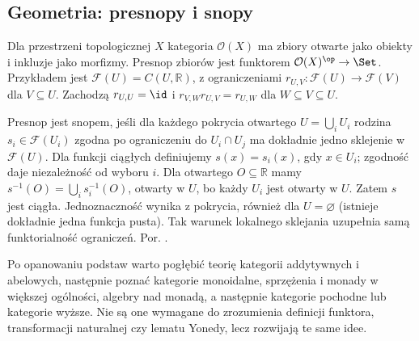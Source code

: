 \subsection{Geometria: presnopy i snopy}

\begin{przyklad}\label{cat:ex:continuous-sheaf}
Dla przestrzeni topologicznej $X$ kategoria $\mathcal O(X)$ ma zbiory otwarte jako obiekty i inkluzje jako morfizmy. Presnop zbiorów jest funktorem $\mathcal O(X)^{\op}\to\Set$. Przykładem jest $\mathcal F(U)=C(U,\mathbb R)$, z ograniczeniami $r_{U,V}:\mathcal F(U)\to\mathcal F(V)$ dla $V\subseteq U$. Zachodzą $r_{U,U}=\id$ i $r_{V,W}r_{U,V}=r_{U,W}$ dla $W\subseteq V\subseteq U$.

Presnop jest snopem, jeśli dla każdego pokrycia otwartego $U=\bigcup_i U_i$ rodzina $s_i\in\mathcal F(U_i)$ zgodna po ograniczeniu do $U_i\cap U_j$ ma dokładnie jedno sklejenie w $\mathcal F(U)$. Dla funkcji ciągłych definiujemy $s(x)=s_i(x)$, gdy $x\in U_i$; zgodność daje niezależność od wyboru $i$. Dla otwartego $O\subseteq\mathbb R$ mamy $s^{-1}(O)=\bigcup_i s_i^{-1}(O)$, otwarty w $U$, bo każdy $U_i$ jest otwarty w $U$. Zatem $s$ jest ciągła. Jednoznaczność wynika z pokrycia, również dla $U=\varnothing$ (istnieje dokładnie jedna funkcja pusta). Tak warunek lokalnego sklejania uzupełnia samą funktorialność ograniczeń. Por. .
\end{przyklad}

\begin{uwaga}
Po opanowaniu podstaw warto pogłębić teorię kategorii addytywnych i abelowych, następnie poznać kategorie monoidalne, sprzężenia i monady w większej ogólności, algebry nad monadą, a następnie kategorie pochodne lub kategorie wyższe. Nie są one wymagane do zrozumienia definicji funktora, transformacji naturalnej czy lematu Yonedy, lecz rozwijają te same idee.
\end{uwaga}

